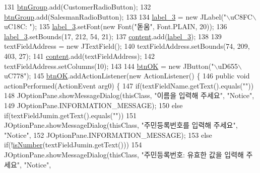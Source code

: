 \begin{DoxyCode}
131         \hyperlink{classpkg_1_1_person_u_i_ab021b25096eb0dec11276a56b226dc42}{btnGroup}.add(CustomerRadioButton);
132         \hyperlink{classpkg_1_1_person_u_i_ab021b25096eb0dec11276a56b226dc42}{btnGroup}.add(SalesmanRadioButton);
133         
134         \hyperlink{classpkg_1_1_person_u_i_a6f0d2bbe796a121c3d68046ac8f8e7e3}{label\_3} = \textcolor{keyword}{new} JLabel(\textcolor{stringliteral}{"\(\backslash\)uC8FC\(\backslash\)uC18C: "});
135         \hyperlink{classpkg_1_1_person_u_i_a6f0d2bbe796a121c3d68046ac8f8e7e3}{label\_3}.setFont(\textcolor{keyword}{new} Font(\textcolor{stringliteral}{"돋움"}, Font.PLAIN, 20));
136         \hyperlink{classpkg_1_1_person_u_i_a6f0d2bbe796a121c3d68046ac8f8e7e3}{label\_3}.setBounds(17, 212, 54, 21);
137         \hyperlink{classpkg_1_1_person_u_i_a05931d9e728132b35d239a5229eea21d}{content}.add(\hyperlink{classpkg_1_1_person_u_i_a6f0d2bbe796a121c3d68046ac8f8e7e3}{label\_3});
138         
139         textFieldAddress = \textcolor{keyword}{new} JTextField();
140         textFieldAddress.setBounds(74, 209, 403, 27);
141         \hyperlink{classpkg_1_1_person_u_i_a05931d9e728132b35d239a5229eea21d}{content}.add(textFieldAddress);
142         textFieldAddress.setColumns(10);
143         
144         \hyperlink{classpkg_1_1_person_u_i_ac8976435621b24ee0012f2553d5e168d}{btnOK} = \textcolor{keyword}{new} JButton(\textcolor{stringliteral}{"\(\backslash\)uD655\(\backslash\)uC778"});
145         \hyperlink{classpkg_1_1_person_u_i_ac8976435621b24ee0012f2553d5e168d}{btnOK}.addActionListener(\textcolor{keyword}{new} ActionListener() \{
146             \textcolor{keyword}{public} \textcolor{keywordtype}{void} actionPerformed(ActionEvent arg0) \{
147                 \textcolor{keywordflow}{if}(textFieldName.getText().equals(\textcolor{stringliteral}{""}))
148                     JOptionPane.showMessageDialog(thisClass, \textcolor{stringliteral}{"이름을 입력해 주세요"}, \textcolor{stringliteral}{"Notice"}, 
149                             JOptionPane.INFORMATION\_MESSAGE);
150                 \textcolor{keywordflow}{else} \textcolor{keywordflow}{if}(textFieldJumin.getText().equals(\textcolor{stringliteral}{""}))
151                     JOptionPane.showMessageDialog(thisClass, \textcolor{stringliteral}{"주민등록번호를 입력해 주세요"}, \textcolor{stringliteral}{"Notice"}, 
152                             JOptionPane.INFORMATION\_MESSAGE);
153                 \textcolor{keywordflow}{else} \textcolor{keywordflow}{if}(!\hyperlink{classpkg_1_1_person_u_i_ac378af5584fc8f7bfddb1b05eb0f7289}{isNumber}(textFieldJumin.getText()))
154                     JOptionPane.showMessageDialog(thisClass, \textcolor{stringliteral}{"주민등록번호: 유효한 값을 입력해 주세요"}, \textcolor{stringliteral}{"Notice"}, 

\end{DoxyCode}
